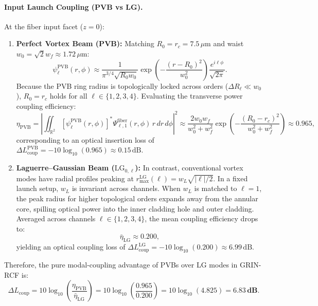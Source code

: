 \documentclass{optica-article}
\begin{document}
\paragraph{Input Launch Coupling (PVB vs LG).}
At the fiber input facet ($z = 0$):
\begin{enumerate}
    \item \textbf{Perfect Vortex Beam (PVB):} Matching $R_0 = r_c = 7.5\,\mu\text{m}$ and waist $w_0 = \sqrt{2} w_f \approx 1.72\,\mu\text{m}$:
    \begin{equation}
    \psi_\ell^{\text{PVB}}(r, \phi) \approx \frac{1}{\pi^{3/4} \sqrt{R_0 w_0}} \exp\left( - \frac{(r - R_0)^2}{w_0^2} \right) \frac{e^{i \ell \phi}}{\sqrt{2\pi}}.
    \label{eq:pvb_input}
    \end{equation}
    Because the PVB ring radius is topologically locked across orders ($\Delta R_\ell \ll w_0$), $R_0 = r_c$ holds for all $\ell \in \{1, 2, 3, 4\}$. Evaluating the transverse power coupling efficiency:
    \begin{equation}
    \eta_{\text{PVB}} = \left| \iint_{\mathbb{R}^2} [\psi_\ell^{\text{PVB}}(r, \phi)]^* \Psi_{\ell, 1}^{\text{fiber}}(r, \phi) \, r \, dr \, d\phi \right|^2 \approx \frac{2 w_0 w_f}{w_0^2 + w_f^2} \exp\left( - \frac{(R_0 - r_c)^2}{w_0^2 + w_f^2} \right) \approx 0.965,
    \label{eq:pvb_coupling_integral}
    \end{equation}
    corresponding to an optical insertion loss of $\Delta L_{\text{coup}}^{\text{PVB}} = -10 \log_{10}(0.965) \approx 0.15\,\text{dB}$.
    \item \textbf{Laguerre--Gaussian Beam ($\text{LG}_{0, \ell}$):} In contrast, conventional vortex modes have radial profiles peaking at $r_{\max}^{\text{LG}}(\ell) = w_L \sqrt{|\ell|/2}$. In a fixed launch setup, $w_L$ is invariant across channels. When $w_L$ is matched to $\ell=1$, the peak radius for higher topological orders expands away from the annular core, spilling optical power into the inner cladding hole and outer cladding. Averaged across channels $\ell \in \{1, 2, 3, 4\}$, the mean coupling efficiency drops to:
    \begin{equation}
    \bar{\eta}_{\text{LG}} \approx 0.200,
    \label{eq:lg_mean_coupling}
    \end{equation}
    yielding an optical coupling loss of $\Delta L_{\text{coup}}^{\text{LG}} = -10 \log_{10}(0.200) \approx 6.99\,\text{dB}$.
\end{enumerate}
Therefore, the pure modal-coupling advantage of PVBs over LG modes in GRIN-RCF is:
\begin{equation}
\boxed{\Delta L_{\text{coup}} = 10 \log_{10}\left( \frac{\eta_{\text{PVB}}}{\bar{\eta}_{\text{LG}}} \right) = 10 \log_{10}\left( \frac{0.965}{0.200} \right) = 10 \log_{10}(4.825) = \mathbf{6.83\,\text{dB}}.}
\label{eq:coupling_advantage_db}
\end{equation}
\end{document}
